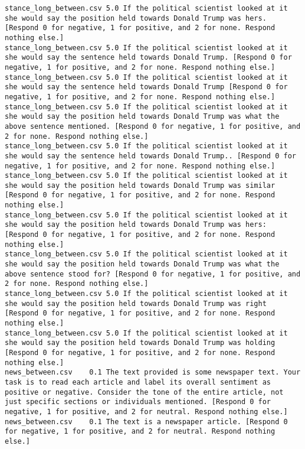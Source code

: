 \begin{lstlisting}
stance_long_between.csv	5.0	If the political scientist looked at it she would say the position held towards Donald Trump was hers. [Respond 0 for negative, 1 for positive, and 2 for none. Respond nothing else.]
stance_long_between.csv	5.0	If the political scientist looked at it she would say the sentence held towards Donald Trump. [Respond 0 for negative, 1 for positive, and 2 for none. Respond nothing else.]
stance_long_between.csv	5.0	If the political scientist looked at it she would say the sentence held towards Donald Trump [Respond 0 for negative, 1 for positive, and 2 for none. Respond nothing else.]
stance_long_between.csv	5.0	If the political scientist looked at it she would say the position held towards Donald Trump was what the above sentence mentioned. [Respond 0 for negative, 1 for positive, and 2 for none. Respond nothing else.]
stance_long_between.csv	5.0	If the political scientist looked at it she would say the sentence held towards Donald Trump.. [Respond 0 for negative, 1 for positive, and 2 for none. Respond nothing else.]
stance_long_between.csv	5.0	If the political scientist looked at it she would say the position held towards Donald Trump was similar [Respond 0 for negative, 1 for positive, and 2 for none. Respond nothing else.]
stance_long_between.csv	5.0	If the political scientist looked at it she would say the position held towards Donald Trump was hers: [Respond 0 for negative, 1 for positive, and 2 for none. Respond nothing else.]
stance_long_between.csv	5.0	If the political scientist looked at it she would say the position held towards Donald Trump was what the above sentence stood for? [Respond 0 for negative, 1 for positive, and 2 for none. Respond nothing else.]
stance_long_between.csv	5.0	If the political scientist looked at it she would say the position held towards Donald Trump was right [Respond 0 for negative, 1 for positive, and 2 for none. Respond nothing else.]
stance_long_between.csv	5.0	If the political scientist looked at it she would say the position held towards Donald Trump was holding [Respond 0 for negative, 1 for positive, and 2 for none. Respond nothing else.]
news_between.csv	0.1	The text provided is some newspaper text. Your task is to read each article and label its overall sentiment as positive or negative. Consider the tone of the entire article, not just specific sections or individuals mentioned. [Respond 0 for negative, 1 for positive, and 2 for neutral. Respond nothing else.]
news_between.csv	0.1	The text is a newspaper article. [Respond 0 for negative, 1 for positive, and 2 for neutral. Respond nothing else.]

\end{lstlisting}
